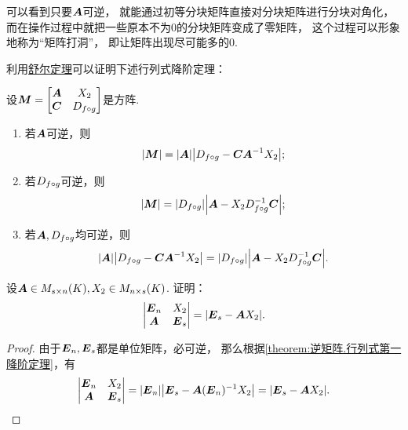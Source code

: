 可以看到只要\(\boldsymbol{A}\)可逆，
就能通过初等分块矩阵直接对分块矩阵进行分块对角化，
而在操作过程中就把一些原本不为0的分块矩阵变成了零矩阵，
这个过程可以形象地称为“矩阵打洞”，
即让矩阵出现尽可能多的0.

利用\hyperref[theorem:逆矩阵.舒尔定理]{舒尔定理}可以证明下述行列式降阶定理：
\begin{theorem}[行列式第一降阶定理]\label{theorem:逆矩阵.行列式第一降阶定理}
\def\M{\vb{M}}
设\(\M = \begin{bmatrix}
	\A & \B \\
	\C & \D
\end{bmatrix}\)是方阵.
\begin{enumerate}
	\item 若\(\boldsymbol{A}\)可逆，则\[
		\abs{\M} = \abs{\A} \abs{\D - \C \A^{-1} \B};
	\]

	\item 若\(D_{f \circ g}\)可逆，则\[
		\abs{\M} = \abs{\D} \abs{\A - \B \D^{-1} \C};
	\]

	\item 若\(\boldsymbol{A},D_{f \circ g}\)均可逆，则\[
		\abs{\boldsymbol{A}} \abs{D_{f \circ g} - \boldsymbol{C} \boldsymbol{A}^{-1} X_2}
		= \abs{D_{f \circ g}} \abs{\boldsymbol{A} - X_2 D_{f \circ g}^{-1} \boldsymbol{C}}.
	\]
\end{enumerate}
\end{theorem}

\begin{example}\label{example:逆矩阵.行列式降阶定理的重要应用1}
设\(\boldsymbol{A} \in M_{s \times n}(K),
X_2 \in M_{n \times s}(K)\).
证明：\[
	\begin{vmatrix}
		\boldsymbol{E}_n & X_2 \\
		\boldsymbol{A} & \boldsymbol{E}_s
	\end{vmatrix} = \abs{\boldsymbol{E}_s - \boldsymbol{A}X_2}.
\]
\begin{proof}
由于\(\boldsymbol{E}_n,\boldsymbol{E}_s\)都是单位矩阵，必可逆，
那么根据\cref{theorem:逆矩阵.行列式第一降阶定理}，有\[
	\begin{vmatrix}
		\boldsymbol{E}_n & X_2 \\
		\boldsymbol{A} & \boldsymbol{E}_s
	\end{vmatrix}
	= \abs{\boldsymbol{E}_n} \abs{\boldsymbol{E}_s - \boldsymbol{A}(\boldsymbol{E}_n)^{-1}X_2}
	= \abs{\boldsymbol{E}_s - \boldsymbol{A}X_2}.
	\qedhere
\]
\end{proof}
\end{example}

